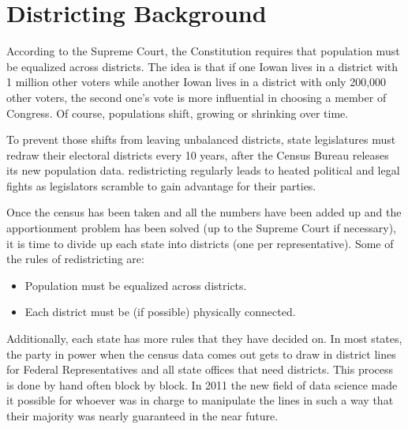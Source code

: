 \section{Districting Background}
\label{sec:district}
According to the Supreme Court, the Constitution requires that population must be equalized across districts. The idea is that if one Iowan lives in a district with 1 million other voters while another Iowan lives in a district with only 200,000 other voters, the second one's vote is more influential in choosing a member of Congress. Of course, populations shift, growing or shrinking over time.

To prevent those shifts from leaving unbalanced districts, state legislatures must redraw their electoral districts every 10 years, after the Census Bureau releases its new population data. redistricting regularly leads to heated political and legal fights as legislators scramble to gain advantage for their parties.

Once the census has been taken and all the numbers have been added up and the apportionment problem has been solved (up to the Supreme Court if necessary), it is time to divide up each state into districts (one per representative).  Some of the rules of redistricting are: 
\begin{itemize}
	\item Population must be equalized across districts. \vfill
	\item Each district must be (if possible) physically connected.\vfill
\end{itemize}
Additionally, each state has more rules that they have decided on.  In most states, the party in power when the census data comes out gets to draw in district lines for Federal Representatives and all state offices that need districts.  This process is done by hand often block by block.  In 2011 the new field of data science made it possible for whoever was in charge to manipulate the lines in such a way that their majority was nearly guaranteed in the near future.
 
\clearpage